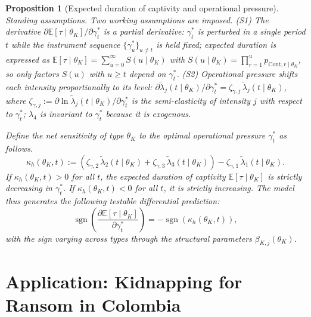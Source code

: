 \documentclass[pdflatex,sn-mathphys-ay]{sn-jnl}
\theoremstyle{plain}
\newtheorem{proposition}[theorem]{Proposition}
\theoremstyle{definition}
\newcommand{\1}{\mathbf{1}}
\begin{document}
\begin{proposition}[Expected duration of captivity and operational pressure]
\label{prop:expected-captivity-gamma}
\noindent\textit{Standing assumptions.} Two working assumptions are imposed. \textup{(S1)} The derivative $\partial\mathbb{E}[\tau\mid\theta_K]/\partial\gamma_t^\ast$ is a partial derivative: $\gamma_t^\ast$ is perturbed in a single period $t$ while the instrument sequence $\{\gamma_u^\ast\}_{u\neq t}$ is held fixed; expected duration is expressed as $\mathbb{E}[\tau\mid\theta_K]=\sum_{u=0}^{\infty}S(u\mid\theta_K)$ with $S(u\mid\theta_K)=\prod_{r=1}^{u}p_{\mathrm{Cont},r\mid\theta_K}$, so only factors $S(u)$ with $u\geq t$ depend on $\gamma_t^\ast$. \textup{(S2)} Operational pressure shifts each intensity proportionally to its level: $\partial\tilde{\lambda}_j(t\mid\theta_K)/\partial\gamma_t^\ast=\zeta_{\gamma,j}\,\tilde{\lambda}_j(t\mid\theta_K)$, where $\zeta_{\gamma,j}:=\partial\ln\tilde{\lambda}_j(t\mid\theta_K)/\partial\gamma_t^\ast$ is the semi-elasticity of intensity $j$ with respect to $\gamma_t^\ast$; $\lambda_4$ is invariant to $\gamma_t^\ast$ because it is exogenous.

\medskip
Define the net sensitivity of type $\theta_K$ to the optimal operational pressure $\gamma_t^\ast$ as follows.
\begin{equation}
\label{eq:kappa-c}
\kappa_h(\theta_K, t) := \left( \zeta_{\gamma,2}\, \tilde{\lambda}_2(t \mid \theta_K) + \zeta_{\gamma,3}\, \tilde{\lambda}_3(t \mid \theta_K) \right) - \zeta_{\gamma,1}\, \tilde{\lambda}_1(t \mid \theta_K).
\end{equation}
If $\kappa_h(\theta_K, t) > 0$ for all $t$, the expected duration of captivity $\mathbb{E}[\tau \mid \theta_K]$ is strictly decreasing in $\gamma_t^\ast$. If $\kappa_h(\theta_K, t) < 0$ for all $t$, it is strictly increasing. The model thus generates the following testable differential prediction:
\begin{equation}
\operatorname{sgn} \left( \frac{\partial \mathbb{E}[\tau \mid \theta_K]}{\partial \gamma_t^\ast} \right) = - \operatorname{sgn}(\kappa_h(\theta_K, t)),
\end{equation}
with the sign varying across types through the structural parameters $\beta_{K,j}(\theta_K)$.
\end{proposition}

\section{Application: Kidnapping for Ransom in Colombia}\label{sec:application}
\end{document}
